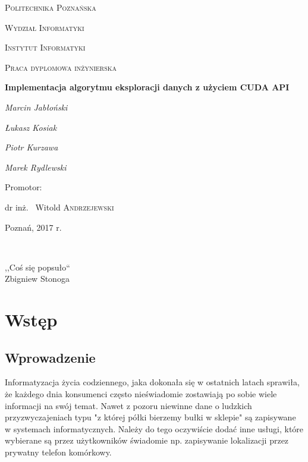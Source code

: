 \documentclass[12pt]{article}
\newcounter{algorytm}
\begin{document}
\begin{titlepage}
	\centering
	{\scshape\LARGE Politechnika Poznańska \par}
	{\scshape\LARGE Wydział Informatyki \par}
	{\scshape\LARGE Instytut Informatyki \par}
	\vspace{1cm}
	{\scshape\Large Praca dyplomowa inżynierska\par}
	\vspace{1.5cm}
	{\huge\bfseries Implementacja algorytmu eksploracji danych z użyciem CUDA API\par}
	\vspace{2cm}
	{\Large\itshape Marcin Jabłoński \par}
	{\Large\itshape Łukasz Kosiak \par}
	{\Large\itshape Piotr Kurzawa \par}
	{\Large\itshape Marek Rydlewski \par}
	\vfill
	\begin{flushright}
	Promotor:\par
	dr inż. ~Witold \textsc{Andrzejewski}
	\end{flushright}
	\vfill
	{\large Poznań, 2017 r.\par}
\end{titlepage}
\thispagestyle{empty} %
$\mbox{ }$
\vfill\vfill
\hfill
\begin{flushright}
\begin{em}
,,Coś się popsuło`` \\
Zbigniew Stonoga
\end{em}
\end{flushright}
\vfill\pagebreak
\tableofcontents
\newpage

\section{Wstęp}

\subsection{Wprowadzenie}
Informatyzacja życia codziennego, jaka dokonała się w ostatnich latach sprawiła, że każdego dnia konsumenci często nieświadomie zostawiają po sobie wiele informacji na swój temat. Nawet z pozoru niewinne dane o ludzkich przyzwyczajeniach typu "z której półki bierzemy bułki w sklepie" są zapisywane w systemach informatycznych. Należy do tego oczywiście dodać inne usługi, które wybierane są przez użytkowników świadomie np. zapisywanie lokalizacji przez prywatny telefon komórkowy.
\end{document}
